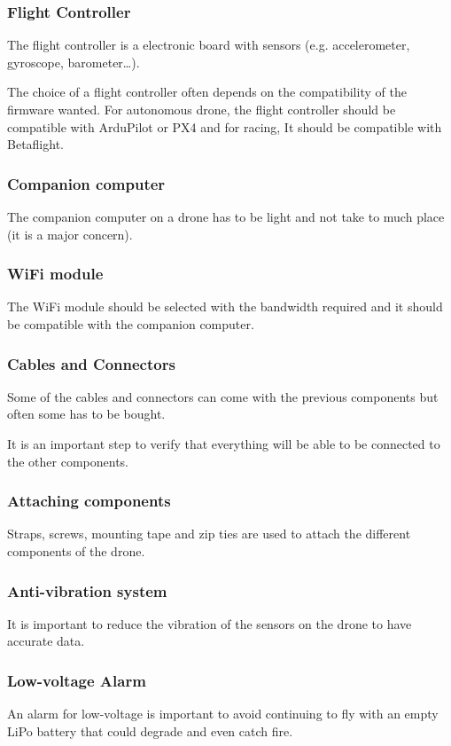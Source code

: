\subsubsection{Flight Controller}
The flight controller is a electronic board with sensors (e.g. accelerometer, gyroscope, barometer…).

The choice of a flight controller often depends on the compatibility of the firmware wanted. For autonomous drone, the flight controller should be compatible with ArduPilot or PX4 and for racing, It should be compatible with Betaflight.

\subsubsection{Companion computer}
The companion computer on a drone has to be light and not take to much place (it is a major concern).

\subsubsection{WiFi module}
The WiFi module should be selected with the bandwidth required and it should be compatible with the companion computer.

\subsubsection{Cables and Connectors}
Some of the cables and connectors can come with the previous components but often some has to be bought.

It is an important step to verify that everything will be able to be connected to the other components.

\subsubsection{Attaching components}
Straps, screws, mounting tape and zip ties are used to attach the different components of the drone.

\subsubsection{Anti-vibration system}
It is important to reduce the vibration of the sensors on the drone to have accurate data.

\subsubsection{Low-voltage Alarm}
An alarm for low-voltage is important to avoid continuing to fly with an empty LiPo battery that could degrade and even catch fire.

